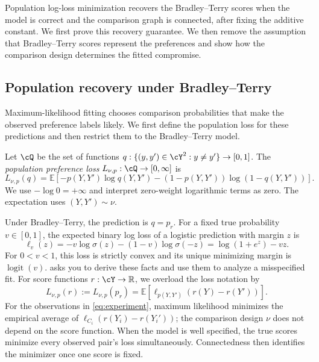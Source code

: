 \documentclass[11pt,twoside]{article}
\newcommand{\E}{\mathbb E}
\newcommand{\R}{\mathbb R}
\theoremstyle{definition}
\theoremstyle{remark}
\begin{document}
Population log-loss minimization recovers the Bradley--Terry scores when
the model is correct and the comparison graph is connected, after fixing
the additive constant. We first prove this recovery guarantee. We then
remove the assumption that Bradley--Terry scores represent the preferences
and show how the comparison design determines the fitted compromise.

\subsection{Population recovery under Bradley--Terry}

Maximum-likelihood fitting chooses comparison probabilities that make the
observed preference labels likely. We first define the population loss for
these predictions and then restrict them to the Bradley--Terry model.

Let $\cQ$ be the set of functions
$q:\{(y,y')\in\cY^2:y\ne y'\}\to[0,1]$. The \emph{population
preference loss} $L_{\nu,p}:\cQ\to[0,\infty]$ is
\begin{equation}
 L_{\nu,p}(q)=\E\!\left[
 -p(Y,Y')\log q(Y,Y')-(1-p(Y,Y'))\log(1-q(Y,Y'))\right].
 \label{eq:reward-risk}
\end{equation}
We use $-\log0=+\infty$ and interpret zero-weight logarithmic terms as
zero. The expectation uses $(Y,Y')\sim\nu$.

Under Bradley--Terry, the prediction is $q=p_r$. For a fixed true
probability $v\in[0,1]$, the expected binary log loss of a logistic
prediction with margin $z$ is
\begin{equation}
 \ell_v(z)=-v\log\sigma(z)-(1-v)\log\sigma(-z)
 =\log(1+e^z)-vz.
 \label{eq:logistic-loss}
\end{equation}
For $0<v<1$, this loss is strictly convex and its unique minimizing margin
is $\operatorname{logit}(v)$.  asks you to
derive these facts and use them to analyze a misspecified fit.
For score functions $r:\cY\to\R$, we overload the loss notation by
\[
 L_{\nu,p}(r):=L_{\nu,p}(p_r)
 =\E[\ell_{p(Y,Y')}(r(Y)-r(Y'))].
\]
For the observations in \cref{eq:experiment}, maximum likelihood minimizes
the empirical average of $\ell_{C_i}(r(Y_i)-r(Y_i'))$; the comparison
design $\nu$ does not depend on the score function.
When the model is well specified, the true scores minimize every observed
pair's loss simultaneously. Connectedness then identifies the minimizer
once one score is fixed.
\end{document}
